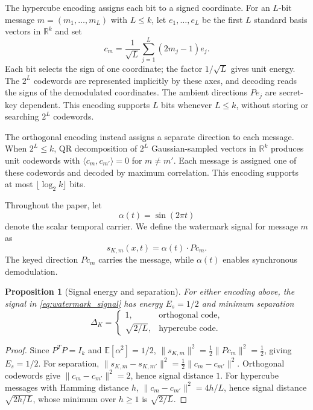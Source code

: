 \documentclass[11pt]{article}
\newtheorem{proposition}{Proposition}
\begin{document}
The hypercube encoding assigns each bit to a signed coordinate.
For an $L$-bit message $m=(m_1,\ldots,m_L)$ with $L\leq k$, let
$e_1,\ldots,e_L$ be the first $L$ standard basis vectors in
$\mathbb R^k$ and set
\begin{equation}\label{eq:hypercube-codeword}
c_m=\frac{1}{\sqrt L}\sum_{j=1}^L(2m_j-1)e_j.
\end{equation}
Each bit selects the sign of one coordinate; the factor $1/\sqrt L$
gives unit energy. The $2^L$ codewords are represented implicitly by
these axes, and decoding reads the signs of the demodulated coordinates.
The ambient directions $Pe_j$ are secret-key dependent. This encoding
supports $L$ bits whenever $L\leq k$, without storing or searching
$2^L$ codewords.

The orthogonal encoding instead assigns a separate direction to each
message. When $2^L\leq k$, QR decomposition of $2^L$ Gaussian-sampled vectors
in $\mathbb R^k$ produces unit codewords with
$\langle c_m,c_{m'}\rangle=0$ for $m\ne m'$. Each message is assigned
one of these codewords and decoded by maximum correlation.
This encoding supports at most $\lfloor\log_2 k\rfloor$ bits.

Throughout the paper, let
\begin{equation}
\alpha(t) = \sin(2\pi t)
\end{equation}
denote the scalar temporal carrier. We define the watermark signal for
message $m$ as
\begin{equation}\label{eq:watermark_signal}
s_{K,m}(x,t) = \alpha(t) \cdot P c_m.
\end{equation}
The keyed direction $P c_m$ carries the message, while $\alpha(t)$
enables synchronous demodulation.

\begin{proposition}[Signal energy and separation]\label{prop:energy-sep}
For either encoding above, the signal in \eqref{eq:watermark_signal}
has energy $E_s = 1/2$ and minimum separation
\[
\Delta_K = \begin{cases}
1, & \text{orthogonal code},\\
\sqrt{2/L}, & \text{hypercube code}.
\end{cases}
\]
\end{proposition}

\begin{proof}
Since $P^TP = I_k$ and $\mathbb{E}[\alpha^2] = 1/2$,
$\|s_{K,m}\|^2 = \tfrac12\|Pc_m\|^2 = \tfrac12$, giving $E_s = 1/2$.
For separation,
$\|s_{K,m}-s_{K,m'}\|^2 = \tfrac12\|c_m-c_{m'}\|^2$.
Orthogonal codewords give $\|c_m-c_{m'}\|^2 = 2$, hence signal
distance $1$. For hypercube messages with Hamming distance $h$,
$\|c_m-c_{m'}\|^2 = 4h/L$, hence signal distance $\sqrt{2h/L}$, whose
minimum over $h\ge1$ is $\sqrt{2/L}$.
\end{proof}
\end{document}
